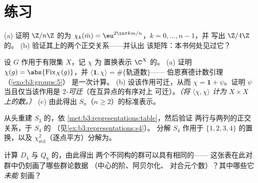 \section{练习}

\begin{exercise}[$\star$]\label{exo:b3:representations:1}
(a) 证明 $\Z/n\Z$ 的为
$\chi_k(\bar m) = \eu^{2\iu\pi km/n}$，$k = 0, \dots, n-1$，并
写出 $\Z/4\Z$ 的。
(b) 验证其上的两个正交关系——并认出
该矩阵：本书何处见过它？
\end{exercise}

\begin{exercise}[$\star$]\label{exo:b3:representations:2}
设 $G$ 作用于有限集 $X$，记 $\chi$ 为
置换表示 $\C^X$ 的。
(a) 证明 $\chi(g) = \abs{\operatorname{Fix}_X(g)}$，并
$\langle \mathbf 1, \chi\rangle = \#\{\text{轨道数}\}$——
伯恩赛德计数引理（\cref{exo:b3:groups:5}）
是一次计算。
(b) 设该作用可迁，从而 $\chi = \mathbf 1 +
\psi$。证明 $\psi$ 当且仅当该作用是
\emph{$2$-可迁}（在互异点的有序对上
可迁）。\emph{（将 $\langle\chi,\chi\rangle$ 计为
$X \times X$ 上的数。）}
(c) 由此得出 $S_n$（$n \geq
2$）的标准表示。
\end{exercise}

\begin{exercise}[$\star$]\label{exo:b3:representations:3}
从头重建 $S_3$ 的，依
\cref{met:b3:representations:table}，然后验证
两行与两列的正交关系，于 $S_4$ 的
（见\cref{ex:b3:representations:s4}）。
分解 $S_4$ 作用于 $\{1,2,3,4\}$ 的置换，以及
$\chi_{\mathrm{std}}^2$（逐点平方）分解为。
\end{exercise}

\begin{exercise}[$\star\star$]\label{exo:b3:representations:4}
计算 $D_4$ 与 $Q_8$ 的，由此得出
两个不同构的群可以具有相同的——
这张表在此对群中仍刻画了哪些群论数据
（中心的阶、阿贝尔化、
对合元个数）？其中哪些它\emph{未能}
刻画？
\end{exercise}

